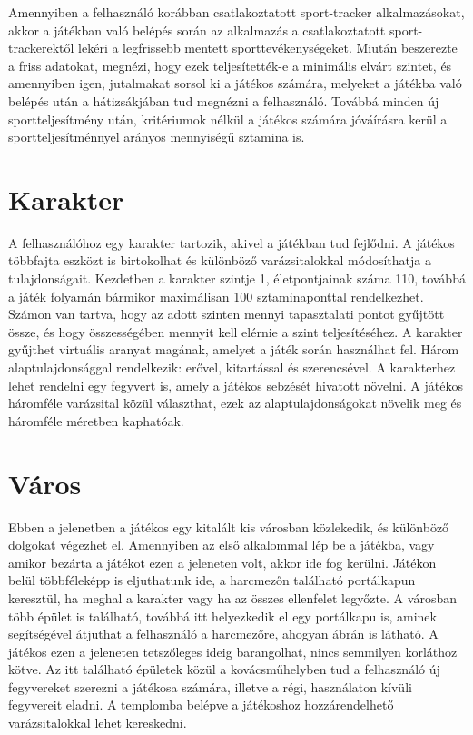 Amennyiben a felhasználó korábban csatlakoztatott sport-tracker alkalmazásokat, akkor a játékban való belépés során az alkalmazás a csatlakoztatott sport-trackerektől lekéri a legfrissebb mentett sporttevékenységeket. 
Miután beszerezte a friss adatokat, megnézi, hogy ezek teljesítették-e a minimális elvárt szintet, és amennyiben igen, jutalmakat sorsol ki a játékos számára, melyeket a játékba való belépés után a hátizsákjában tud megnézni a felhasználó. 
Továbbá minden új sportteljesítmény után, kritériumok nélkül a játékos számára jóváírásra kerül a sportteljesítménnyel arányos mennyiségű sztamina is. 

\section{Karakter}
\label{karakter}
A felhasználóhoz egy karakter tartozik, akivel a játékban tud fejlődni. 
A játékos többfajta eszközt is birtokolhat és különböző varázsitalokkal módosíthatja a tulajdonságait. 
Kezdetben a karakter szintje 1, életpontjainak száma 110, továbbá a játék folyamán bármikor maximálisan 100 sztaminaponttal rendelkezhet. 
Számon van tartva, hogy az adott szinten mennyi tapasztalati pontot gyűjtött össze, és hogy összességében mennyit kell elérnie a szint teljesítéséhez. 
A karakter gyűjthet virtuális aranyat magának, amelyet a játék során használhat fel. 
Három alaptulajdonsággal rendelkezik: erővel, kitartással és szerencsével. 
A karakterhez lehet rendelni egy fegyvert is, amely a játékos sebzését hivatott növelni.
A játékos háromféle varázsital közül választhat, ezek az alaptulajdonságokat növelik meg és háromféle méretben kaphatóak. 

\section{Város}
\label{varos}


Ebben a jelenetben a játékos egy kitalált kis városban közlekedik, és különböző dolgokat végezhet el. 
Amennyiben az első alkalommal lép be a játékba, vagy amikor bezárta a játékot ezen a jeleneten volt, akkor ide fog kerülni. 
Játékon belül többféleképp is eljuthatunk ide, a harcmezőn található portálkapun keresztül, ha meghal a karakter vagy ha az összes ellenfelet legyőzte. 
A városban több épület is található, továbbá itt helyezkedik el egy portálkapu is, aminek segítségével átjuthat a felhasználó a harcmezőre, ahogyan  ábrán is látható. 
A játékos ezen a jeleneten tetszőleges ideig barangolhat, nincs semmilyen korláthoz kötve. 
Az itt található épületek közül a kovácsműhelyben tud a felhasználó új fegyvereket szerezni a játékosa számára, illetve a régi, használaton kívüli fegyvereit eladni.
A templomba belépve a játékoshoz hozzárendelhető varázsitalokkal lehet kereskedni. 


